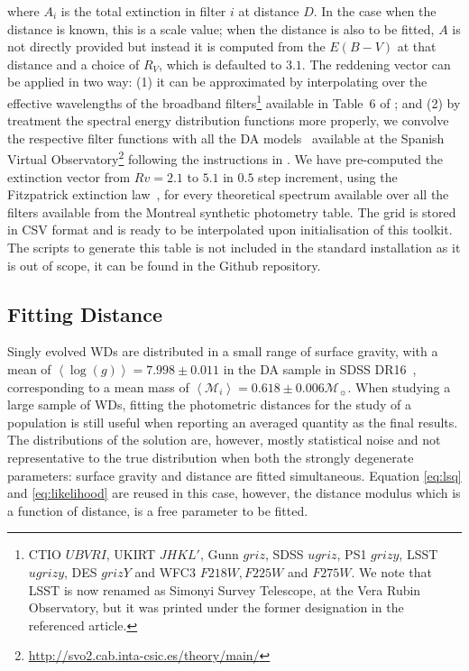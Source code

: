 \documentclass[fleqn,usenatbib]{rasti}
\newcommand{\msun}{\mathcal{M}_{\sun}}
\begin{document}
where $A_i$ is the total extinction in filter $i$ at distance $D$. In the case
when the distance is known, this is a scale value; when the distance is also
to be fitted, $A$ is not directly provided but instead it is computed from the
$E(B-V)$ at that distance and a choice of $R_{V}$, which is defaulted to $3.1$.
The reddening vector can be applied in two way: (1) it can be approximated by
interpolating over the effective wavelengths of the broadband
filters\footnote{CTIO $UBVRI$, UKIRT $JHKL'$, Gunn $griz$, SDSS $ugriz$,
PS1 $grizy$, LSST $ugrizy$, DES $grizY$ and WFC3 $F218W, F225W$ and $F275W$.
We note that LSST is now renamed as Simonyi Survey Telescope, at the Vera Rubin
Observatory, but it was printed under the former designation in the referenced
article.} available in Table~6 of \citet{2011ApJ...737..103S}; and (2) by
treatment the spectral energy distribution functions more properly, we convolve
the respective filter functions with all the DA
models~\citep{2009ApJ...696.1755T, 2010MmSAI..81..921K} available at the
Spanish Virtual
Observatory\footnote{\url{http://svo2.cab.inta-csic.es/theory/main/}} following
the instructions in \citet{2011ApJ...737..103S}. We have pre-computed the
extinction vector from $Rv = 2.1$ to $5.1$ in $0.5$ step increment, using the
Fitzpatrick extinction law~\citep{1999PASP..111...63F}, for every theoretical
spectrum available over all the filters available from the Montreal synthetic
photometry table. The grid is stored in CSV format and is ready to be
interpolated upon initialisation of this toolkit. The scripts to generate this
table is not included in the standard installation as it is out of scope, it
can be found in the Github repository.

\subsection{Fitting Distance}
Singly evolved WDs are distributed in a small range of surface gravity, with a
mean of $\left<\log(g)\right> = 7.998 \pm 0.011$ in the DA sample in SDSS
DR16~\citep{2021MNRAS.507.4646K}, corresponding to a mean mass of
$\left<\mathcal{M}_i\right> = 0.618 \pm 0.006 \msun$. When studying a large sample of WDs,
fitting the photometric distances for the study of a population is still
useful when reporting an averaged quantity as the final results. The
distributions of the solution are, however, mostly statistical noise and not
representative to the true distribution when both the strongly degenerate
parameters: surface gravity and distance are fitted simultaneous. Equation
\ref{eq:lsq} and \ref{eq:likelihood} are reused in this case, however, the
distance modulus which is a function of distance, is a free parameter to be
fitted.
\end{document}

